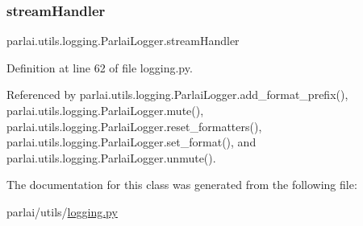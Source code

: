 \mbox{\label{classparlai_1_1utils_1_1logging_1_1ParlaiLogger_a2c40840c6e6fa00eb4cdae9146907b78}} 
\subsubsection{\texorpdfstring{stream\+Handler}{streamHandler}}
{\footnotesize\ttfamily parlai.\+utils.\+logging.\+Parlai\+Logger.\+stream\+Handler}



Definition at line 62 of file logging.\+py.



Referenced by parlai.\+utils.\+logging.\+Parlai\+Logger.\+add\+\_\+format\+\_\+prefix(), parlai.\+utils.\+logging.\+Parlai\+Logger.\+mute(), parlai.\+utils.\+logging.\+Parlai\+Logger.\+reset\+\_\+formatters(), parlai.\+utils.\+logging.\+Parlai\+Logger.\+set\+\_\+format(), and parlai.\+utils.\+logging.\+Parlai\+Logger.\+unmute().



The documentation for this class was generated from the following file\+:\begin{DoxyCompactItemize}
\item 
parlai/utils/\hyperlink{logging_8py}{logging.\+py}\end{DoxyCompactItemize}
